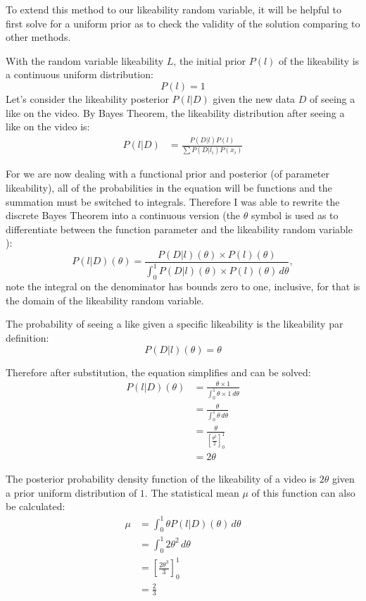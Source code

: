 \documentclass[a4paper,11pt]{article}
\begin{document}
To extend this method to our likeability random variable, it will be helpful to first solve for a uniform prior as to check the validity of the solution comparing to other methods.

With the random variable likeability $L$, the initial prior $P(l)$ of the likeability is a continuous uniform distribution:
\[
    P(l) = 1
\]
Let's consider the likeability posterior $P(l|D)$ given the new data $D$ of seeing a like on the video. By Bayes Theorem, the likeability distribution after seeing a like on the video is:
\begin{align*}
    P(l|D) &= \frac{P(D|l) P(l)}{\sum P(D|l_i) P(x_i) }
\end{align*}

For we are now dealing with a functional prior and posterior (of parameter likeability), all of the probabilities in the equation will be functions and the summation must be switched to integrals. Therefore I was able to rewrite the discrete Bayes Theorem into a continuous version (the $\theta$ symbol is used as to differentiate between the function parameter and the likeability random variable ):
\[
    P(l|D)(\theta) = \frac{P(D|l)(\theta) \times P(l)(\theta)}{\int_{0}^{1} P(D|l)(\theta) \times P(l)(\theta) \, d\theta},
\]
note the integral on the denominator has bounds zero to one, inclusive, for that is the domain of the likeability random variable.

The probability of seeing a like given a specific likeability is the likeability par definition:
\[
    P(D|l)(\theta) = \theta
\]

Therefore after substitution, the equation simplifies and can be solved:
\begin{align*}
    P(l|D)(\theta) &= \frac{\theta \times 1}{\int_{0}^{1} \theta \times 1 \, d\theta}\\
    &= \frac{\theta}{\int_0^1 \theta \, d\theta}\\
    &= \frac{\theta}{[\frac{\theta^2}{2}]^1_0}\\
    &= 2\theta
\end{align*}

The posterior probability density function of the likeability of a video is $2\theta$ given a prior uniform distribution of $1$. The statistical mean $\mu$ of this function can also be calculated:
\begin{align*}
    \mu &= \int_0^1 \theta P(l|D)(\theta) \, d\theta\\
    &= \int_0^1 2\theta^2 \, d\theta\\
    &= [\frac{2\theta^3}{3}]^1_0\\
    &= \frac{2}{3}
\end{align*}
\end{document}

